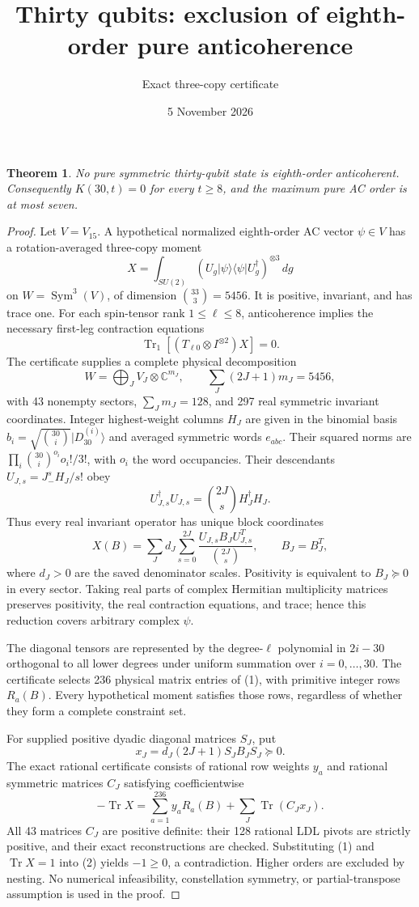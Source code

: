 \documentclass[11pt]{article}
\newtheorem{theorem}{Theorem}
\newcommand{\Tr}{\operatorname{Tr}}
\begin{document}
\title{Thirty qubits: exclusion of eighth-order pure anticoherence}
\author{Exact three-copy certificate}\date{5 November 2026}\maketitle
\begin{theorem}
No pure symmetric thirty-qubit state is eighth-order anticoherent.
Consequently $K(30,t)=0$ for every $t\ge8$, and the maximum pure AC order is at most seven.
\end{theorem}
\begin{proof}
Let $V=V_{15}$. A hypothetical normalized eighth-order AC vector $\psi\in V$ has a rotation-averaged three-copy moment
\[
X=\int_{SU(2)}(U_g|\psi\rangle\langle\psi|U_g^\dagger)^{\otimes3}\,dg
\]
on $W=\operatorname{Sym}^3(V)$, of dimension $\binom{33}{3}=5456$.
It is positive, invariant, and has trace one. For each spin-tensor rank $1\le\ell\le8$, anticoherence implies the necessary first-leg contraction equations
\[
\Tr_1[(T_{\ell0}\otimes I^{\otimes2})X]=0. \tag{1}
\]
The certificate supplies a complete physical decomposition
\[
W=\bigoplus_J V_J\otimes\mathbb C^{m_J},\qquad
\sum_J(2J+1)m_J=5456,
\]
with 43 nonempty sectors, $\sum_Jm_J=128$, and 297 real symmetric invariant coordinates. Integer highest-weight columns $H_J$ are given in the binomial basis $b_i=\sqrt{\binom{30}{i}}|D_{30}^{(i)}\rangle$ and averaged symmetric words $e_{abc}$. Their squared norms are $\prod_i\binom{30}{i}^{o_i}o_i!/3!$, with $o_i$ the word occupancies. Their descendants $U_{J,s}=J_-^sH_J/s!$ obey
\[
U_{J,s}^\dagger U_{J,s}=\binom{2J}{s}H_J^\dagger H_J.
\]
Thus every real invariant operator has unique block coordinates
\[
X(B)=\sum_Jd_J\sum_{s=0}^{2J}\frac{U_{J,s}B_JU_{J,s}^T}{\binom{2J}{s}},\qquad B_J=B_J^T,
\]
where $d_J>0$ are the saved denominator scales. Positivity is equivalent to $B_J\succeq0$ in every sector. Taking real parts of complex Hermitian multiplicity matrices preserves positivity, the real contraction equations, and trace; hence this reduction covers arbitrary complex $\psi$.

The diagonal tensors are represented by the degree-$\ell$ polynomial in $2i-30$ orthogonal to all lower degrees under uniform summation over $i=0,\ldots,30$. The certificate selects 236 physical matrix entries of (1), with primitive integer rows $R_a(B)$. Every hypothetical moment satisfies those rows, regardless of whether they form a complete constraint set.

For supplied positive dyadic diagonal matrices $S_J$, put
\[
x_J=d_J(2J+1)S_JB_JS_J\succeq0.
\]
The exact rational certificate consists of rational row weights $y_a$ and rational symmetric matrices $C_J$ satisfying coefficientwise
\[
\boxed{-\Tr X=\sum_{a=1}^{236}y_aR_a(B)+\sum_J\Tr(C_Jx_J).} \tag{2}
\]
All 43 matrices $C_J$ are positive definite: their 128 rational LDL pivots are strictly positive, and their exact reconstructions are checked. Substituting (1) and $\Tr X=1$ into (2) yields $-1\ge0$, a contradiction. Higher orders are excluded by nesting. No numerical infeasibility, constellation symmetry, or partial-transpose assumption is used in the proof.
\end{proof}
\end{document}
